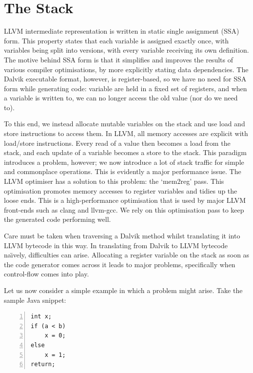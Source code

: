 \section{The Stack}
\label{sec:stack}

LLVM intermediate representation is written in static single assignment (SSA) form. This property states that each variable is assigned exactly once, with variables being split into versions, with every variable receiving its own definition. The motive behind SSA form is that it simplifies and improves the results of various compiler optimisations, by more explicitly stating data dependencies. The Dalvik executable format, however, is register-based, so we have no need for SSA form while generating code: variable are held in a fixed set of registers, and when a variable is written to, we can no longer access the old value (nor do we need to).

To this end, we instead allocate mutable variables on the stack and use load and store instructions to access them. In LLVM, all memory accesses are explicit with load/store instructions. Every read of a value then becomes a load from the stack, and each update of a variable becomes a store to the stack. This paradigm introduces a problem, however; we now introduce a lot of stack traffic for simple and commonplace operations. This is evidently a major performance issue. The LLVM optimiser has a solution to this problem: the `mem2reg' pass. This optimisation promotes memory accesses to register variables and tidies up the loose ends. This is a high-performance optimisation that is used by major LLVM front-ends such as clang and llvm-gcc\footnotemark {}. We rely on this optimisation pass to keep the generated code performing well.

Care must be taken when traversing a Dalvik method whilst translating it into LLVM bytecode in this way. In translating from Dalvik to LLVM bytecode na\"{\i}vely, difficulties can arise. Allocating a register variable on the stack as soon as the code generator comes across it leads to major problems, specifically when control-flow comes into play.

Let us now consider a simple example in which a problem might arise. Take the sample Java snippet:

\lstset{
	language=Java,
	basicstyle=\small,
	stringstyle=\ttfamily
}

\begin{lstlisting}[frame=single, numbers=left, numberstyle=\tiny, caption={Java control-flow example}, label=lst:java_br]
int x;
if (a < b)
    x = 0;
else
    x = 1;
return;
\end{lstlisting}

